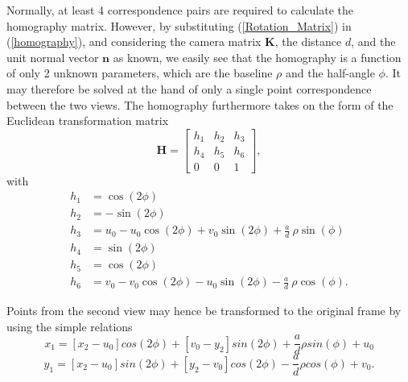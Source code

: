 \documentclass[letterpaper, 10 pt, conference]{ieeeconf}  %
\begin{document}
Normally, at least 4 correspondence pairs are required to calculate the homography matrix. However, by substituting (\ref{Rotation_Matrix}) in (\ref{homography}), and considering the camera matrix $\textbf{K}$, the distance $d$, and the unit normal vector $\textbf{n}$ as known, we easily see that the homography is a function of only 2 unknown parameters, which are the baseline $\rho$ and the half-angle $\phi$. It may therefore be solved at the hand of only a single point correspondence between the two views. The homography furthermore takes on the form of the Euclidean transformation matrix
%
\begin{equation}
    \label{homography_matrix}
    \textbf{H} = \left[
			        \begin{matrix} 
			            h_1 & h_2 & h_3 \\
			            h_4 & h_5 & h_6 \\ 
			            0 & 0 & 1
			        \end{matrix}
    \right],
\end{equation}
%
with
%
\begin{equation}
    \label{homography_matrix_elements}
    \begin{aligned}
        h_1 &=   \cos\left(2\phi\right) \\
        h_2 &= - \sin\left(2\phi\right)\\
        h_3 &=   u_0 - u_0 \cos\left(2\phi\right) + v_0 \sin\left(2\phi\right) + \frac{a}{d}\ \rho\sin\left(\phi\right) \\
        h_4 &=   \sin\left(2\phi\right) \\
        h_5 &=   \cos\left(2\phi\right) \\
        h_6 &=   v_0 - v_0 \cos\left(2\phi\right) - u_0 \sin\left(2\phi\right) - \frac{a}{d}\ \rho\cos\left(\phi\right).
    \end{aligned}
\end{equation}

Points from the second view may hence be transformed to the original frame by using the simple relations
%
\begin{equation}
	\label{H_X}
	x_1 = [x_2 - u_0] cos(2 \phi) + [v_0 - y_2] sin(2 \phi) + \frac{a}{d} \rho sin(\phi) + u_0
\end{equation}
\begin{equation}
	\label{H_Y}
	y_1 = [x_2 - u_0] sin(2 \phi) + [y_2 - v_0] cos(2 \phi) - \frac{a}{d} \rho cos(\phi) + v_0.
\end{equation}
\end{document}
